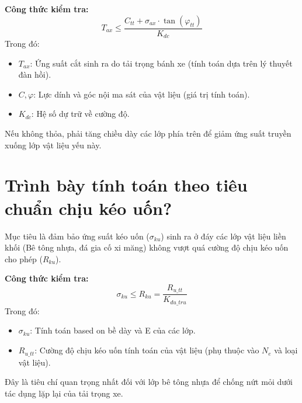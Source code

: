 \documentclass[12pt,a4paper]{article}
\begin{document}
\textbf{Công thức kiểm tra:}
$$ T_{ax} \le \frac{C_{tt} + \sigma_{ax} \cdot \tan(\varphi_{tt})}{K_{dc}} $$
Trong đó:
\begin{itemize}
    \item $T_{ax}$: Ứng suất cắt sinh ra do tải trọng bánh xe (tính toán dựa trên lý thuyết đàn hồi).
    \item $C, \varphi$: Lực dính và góc nội ma sát của vật liệu (giá trị tính toán).
    \item $K_{dc}$: Hệ số dự trữ về cường độ.
\end{itemize}
Nếu không thỏa, phải tăng chiều dày các lớp phía trên để giảm ứng suất truyền xuống lớp vật liệu yếu này.

\section{Trình bày tính toán theo tiêu chuẩn chịu kéo uốn?}
Mục tiêu là đảm bảo ứng suất kéo uốn ($\sigma_{ku}$) sinh ra ở đáy các lớp vật liệu liền khối (Bê tông nhựa, đá gia cố xi măng) không vượt quá cường độ chịu kéo uốn cho phép ($R_{ku}$).

\textbf{Công thức kiểm tra:}
$$ \sigma_{ku} \le R_{ku} = \frac{R_{u\_tt}}{K_{du\_tru}} $$
Trong đó:
\begin{itemize}
    \item $\sigma_{ku}$: Tính toán based on bề dày và E của các lớp.
    \item $R_{u\_tt}$: Cường độ chịu kéo uốn tính toán của vật liệu (phụ thuộc vào $N_e$ và loại vật liệu).
\end{itemize}
Đây là tiêu chí quan trọng nhất đối với lớp bê tông nhựa để chống nứt mỏi dưới tác dụng lặp lại của tải trọng xe.
\end{document}
